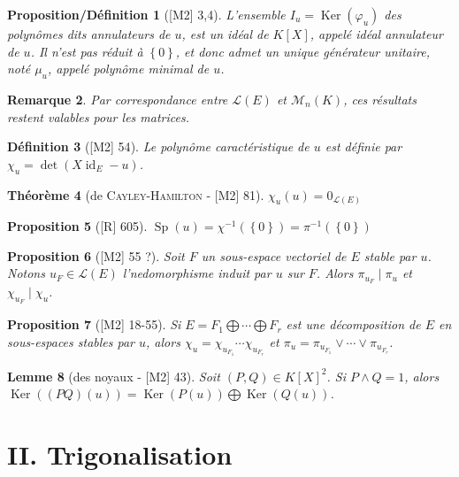 \documentclass[10pt, a4paper, parskip=full, twoside, twocolumn]{report}
\newtheorem{definition}{Définition}
\newtheorem{theorem}[definition]{Théorème}
\newtheorem{proposition}[definition]{Proposition}
\newtheorem{proposition_def}[definition]{Proposition/Définition}
\newtheorem{lemma}[definition]{Lemme}
\newtheorem{remark}[definition]{Remarque}
\DeclareMathOperator{\Ker}{Ker}
\DeclareMathOperator{\id}{id}
\DeclareMathOperator{\Sp}{Sp}
\begin{document}
\begin{proposition_def}[\textnormal{[M2] 3,4}]
	L'ensemble $I_u = \Ker(\varphi_u)$ des polynômes dits \emph{annulateurs de $u$}, est un idéal de $K[X]$,
	appelé \emph{idéal annulateur de $u$}. Il n'est pas réduit à $\left\{0\right\}$, et 
	donc admet un unique générateur unitaire, noté $\mu_u$, appelé \emph{polynôme minimal de $u$}.
\end{proposition_def}

\begin{remark}
	Par correspondance entre $\mathcal{L}(E)$ et $\mathcal{M}_n(K)$, ces résultats restent valables pour les matrices.
\end{remark}

\begin{definition}[\textnormal{[M2] 54}]
	Le \emph{polynôme caractéristique de $u$} est définie par $\chi_u = \det(X\id_E - u)$.
\end{definition}

\begin{theorem}[de \textsc{Cayley-Hamilton} - \textnormal{[M2] 81}]
	$\chi_u(u) = 0_{\mathcal{L}(E)}$
\end{theorem}

\begin{proposition}[\textnormal{[R] 605}]
	$\Sp(u) = \chi^{-1}(\left\{0\right\}) = \pi^{-1}(\left\{0\right\})$
\end{proposition}

\begin{proposition}[\textnormal{[M2] 55 ?}]
	Soit $F$ un sous-espace vectoriel de $E$ stable par $u$.
	Notons $u_F\in\mathcal{L}(E)$ l'nedomorphisme induit par $u$ sur $F$. Alors $\pi_{u_F} \mid \pi_u$ et $\chi_{u_F} \mid \chi_u$.
\end{proposition}

\begin{proposition}[\textnormal{[M2] 18-55}]
	Si $E = F_1\bigoplus \cdots\bigoplus F_r$ est une décomposition de $E$ en sous-espaces stables par $u$,
	alors $\chi_u = \chi_{u_{F_1}} \cdots \chi_{u_{F_r}}$ et $\pi_u = \pi_{u_{F_1}} \vee \cdots \vee \pi_{u_{F_r}}$.
\end{proposition}

\begin{lemma}[des noyaux - \textnormal{[M2] 43}]
	Soit $(P,Q)\in K[X]^2$. Si $P\wedge Q = 1$, alors
	$\Ker\left(\left(PQ\right)(u)\right) = \Ker(P(u))\bigoplus\Ker(Q(u))$.
\end{lemma}

\section*{II. Trigonalisation}
\end{document}
